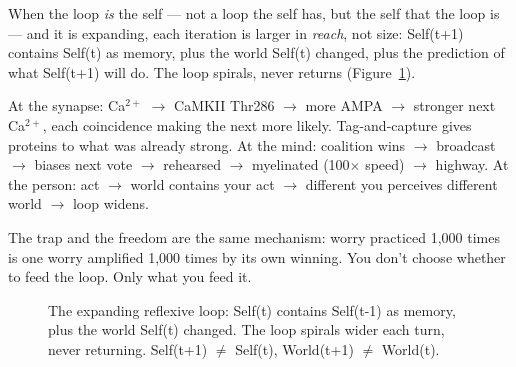 \documentclass[11pt]{article}
\begin{document}
When the loop \emph{is} the self --- not a loop the self has, but the self that the loop is --- and it is expanding, each iteration is larger in \emph{reach}, not size: Self(t+1) contains Self(t) as memory, plus the world Self(t) changed, plus the prediction of what Self(t+1) will do. The loop spirals, never returns (Figure~\ref{fig:expanding}).

At the synapse: Ca$^{2+}$ $\to$\allowbreak{} CaMKII Thr286 $\to$\allowbreak{} more AMPA $\to$\allowbreak{} stronger next Ca$^{2+}$, each coincidence making the next more likely. Tag-and-capture gives proteins to what was already strong. At the mind: coalition wins $\to$\allowbreak{} broadcast $\to$\allowbreak{} biases next vote $\to$\allowbreak{} rehearsed $\to$\allowbreak{} myelinated (100$\times$ speed) $\to$\allowbreak{} highway. At the person: act $\to$\allowbreak{} world contains your act $\to$\allowbreak{} different you perceives different world $\to$\allowbreak{} loop widens.

The trap and the freedom are the same mechanism: worry practiced 1,000 times is one worry amplified 1,000 times by its own winning. You don't choose whether to feed the loop. Only what you feed it.

\begin{figure}[htbp]
\centering
{}
\caption{The expanding reflexive loop: Self(t) contains Self(t-1) as memory, plus the world Self(t) changed. The loop spirals wider each turn, never returning. Self(t+1) $\neq$ Self(t), World(t+1) $\neq$ World(t).}
\label{fig:expanding}
\end{figure}
\end{document}
